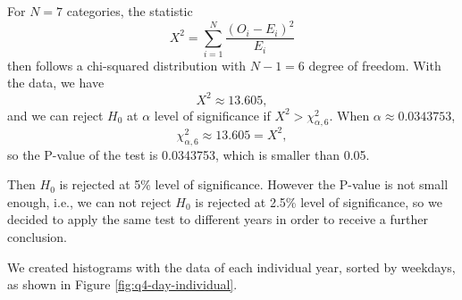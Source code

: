 \documentclass[conf]{new-aiaa}
\begin{document}
For $N=7$ categories, the statistic
\begin{equation}
X^2=\sum_{i=1}^N\frac{(O_i-E_i)^2}{E_i}
\end{equation}
then follows a chi-squared distribution with $N-1=6$ degree of freedom. With the data, we have
$$X^2\approx13.605,$$
and we can reject $H_0$ at $\alpha$ level of significance if $X^2>\chi^2_{\alpha,6}$. When $\alpha\approx0.0343753$,
$$\chi^2_{\alpha,6}\approx13.605=X^2,$$
so the P-value of the test is 0.0343753, which is smaller than 0.05. \medskip

Then $H_0$ is rejected at 5\% level of significance. However the P-value  is not small enough, i.e., we can not reject $H_0$ is rejected at 2.5\% level of significance, so we decided to apply the same test to different years in order to receive a further conclusion. \medskip

We created histograms with the data of each individual year, sorted by weekdays, as shown in Figure \ref{fig:q4-day-individual}. \medskip
\end{document}
